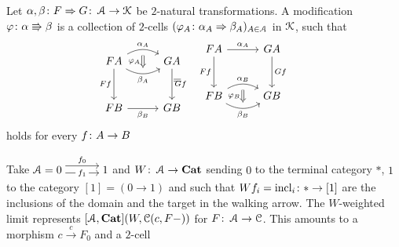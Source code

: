 \documentclass[a4paper,11pt,oneside,openany]{scrbook}
\begin{document}
\begin{defn}
   Let $\alpha,\beta\colon F\Rightarrow G\colon\operatorname{\mathcal{A}}\to\operatorname{\mathcal{K}}$ be $2$-natural transformations. A modification $\varphi\colon\alpha\Rrightarrow\beta$ is a collection of $2$-cells $(\varphi_A\colon\alpha_A\Rightarrow\beta_A)_{A\in\operatorname{\mathcal{A}}}$ in $\operatorname{\mathcal{K}}$, such that 
   \[
    \begin{minipage}{0.3\linewidth}
        \begin{tikzcd}[row sep=1cm, column sep=1cm]
           FA\arrow[d, "Ff"'] \arrow[r, bend right, "\beta_A"', ""{name=D, anchor=center}] \arrow[r, bend left,"\alpha_A", ""{name=U, anchor=center}] & GA \arrow[d, "Gf"] \\
 FB\arrow[r, "\beta_B"']            &GB      
      \ar[Rightarrow, shorten <= .3em, shorten >= .3em, "\varphi_A"', from=U, to=D]
 \end{tikzcd}
    \end{minipage}
    \hspace{-1.3cm}
            =
	\hspace{.4cm}
	\begin{minipage}{0.3\linewidth}
		\begin{tikzcd}[row sep=1cm, column sep=1cm]
 FA\arrow[d,"Ff"'] \arrow[r, "\alpha_A"]                        &  GA\arrow[d,"Gf"] \\
 FB\arrow[r, bend right, "\beta_B"', ""{name=D, anchor=center}] \arrow[r, bend left,"\alpha_B", ""{name=U, anchor=center}] &    GB    
 \ar[Rightarrow, shorten <= .3em, shorten >= .3em, "\varphi_B"', from=U, to=D]
		\end{tikzcd}
	\end{minipage}
    \]
   holds for every $f\colon A\to B$
\end{defn}
Take $\A=\hspace{-1.5mm}\begin{tikzcd}[row sep=1cm, column sep=1.3cm]
		0\hspace{-1.5mm}\arrow[r, "f_1" description,  shift right=.5ex, shorten <= .3em, shorten >= .3em]  \arrow[r, "f_0", shift left=1ex, shorten <= .3em, shorten >= .3em] & \hspace{-1.5mm}1
		\end{tikzcd}\hspace{-1.5mm}$ and $W\colon\operatorname{\mathcal{A}}\to{\normalfont\textbf{Cat}}$ sending $0$ to the terminal category $*$, $1$ to the category $[1]=(0\to 1)$ and such that $Wf_i=\text{incl}_i\colon *\to[1]$ are the inclusions of the domain and the target in the walking arrow. The $W$-weighted limit represents $[\operatorname{\mathcal{A}},{\normalfont\textbf{Cat}}](W,\operatorname{\mathcal{C}}(c,F-))$ for $F\colon\operatorname{\mathcal{A}}\to\operatorname{\mathcal{C}}$. This amounts to a morphism $c\xrightarrow{c}F_0$ and a $2$-cell 
\end{document}
